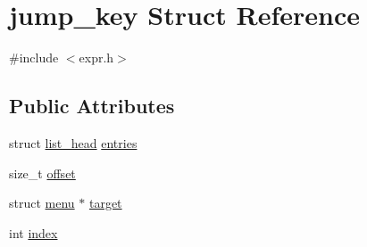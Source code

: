 \hypertarget{structjump__key}{\section{jump\-\_\-key Struct Reference}
\label{structjump__key}
}


{\ttfamily \#include $<$expr.\-h$>$}

\subsection*{Public Attributes}
\begin{DoxyCompactItemize}
\item 
struct \hyperlink{structlist__head}{list\-\_\-head} \hyperlink{structjump__key_a9bdbad4d76b3598a85f8e77e3fb9beb3}{entries}
\item 
size\-\_\-t \hyperlink{structjump__key_ac8f8f1fabe5c4ec156ef259c76176033}{offset}
\item 
struct \hyperlink{structmenu}{menu} $\ast$ \hyperlink{structjump__key_a59b28c613aacd74084afc7bc35da4d3b}{target}
\item 
int \hyperlink{structjump__key_a645e4d52a06ead5e69721e2bc497cadb}{index}
\end{DoxyCompactItemize}


